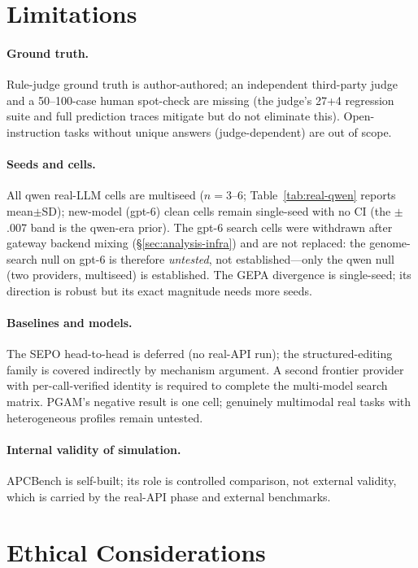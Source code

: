 \documentclass[11pt]{article}
\begin{document}
\section{Limitations}
\label{sec:limitations}

\paragraph{Ground truth.} Rule-judge ground truth is author-authored; an independent third-party judge and a 50--100-case human spot-check are missing (the judge's 27+4 regression suite and full prediction traces mitigate but do not eliminate this). Open-instruction tasks without unique answers (judge-dependent) are out of scope.

\paragraph{Seeds and cells.} All qwen real-LLM cells are multiseed ($n{=}3$--$6$; Table~\ref{tab:real-qwen} reports mean$\pm$SD); new-model (gpt-6) clean cells remain single-seed with no CI (the $\pm$.007 band is the qwen-era prior). The gpt-6 search cells were withdrawn after gateway backend mixing (\S\ref{sec:analysis-infra}) and are not replaced: the genome-search null on gpt-6 is therefore \emph{untested}, not established---only the qwen null (two providers, multiseed) is established. The GEPA divergence is single-seed; its direction is robust but its exact magnitude needs more seeds.

\paragraph{Baselines and models.} The SEPO head-to-head is deferred (no real-API run); the structured-editing family is covered indirectly by mechanism argument. A second frontier provider with per-call-verified identity is required to complete the multi-model search matrix. PGAM's negative result is one cell; genuinely multimodal real tasks with heterogeneous profiles remain untested.

\paragraph{Internal validity of simulation.} APCBench is self-built; its role is controlled comparison, not external validity, which is carried by the real-API phase and external benchmarks.

\section{Ethical Considerations}
\end{document}
